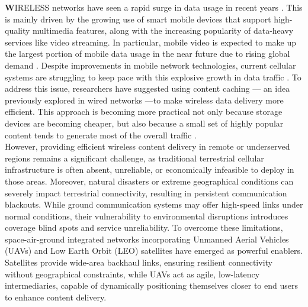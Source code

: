 \documentclass[journal]{IEEEtran}
\begin{document}
{\Huge \textbf{W}}IRELESS networks have seen a rapid surge in data usage in recent years \cite{cisco_internet_report}. This is mainly driven by the growing use of smart mobile devices that support high-quality multimedia features, along with the increasing popularity of data-heavy services like video streaming. In particular, mobile video is expected to make up the largest portion of mobile data usage in the near future due to rising global demand \cite{cisco_internet_report}. Despite improvements in mobile network technologies, current cellular systems are struggling to keep pace with this explosive growth in data traffic \cite{wang2014cache}. To address this issue, researchers have suggested using content caching — an idea previously explored in wired networks \cite{borst2010distributed}—to make wireless data delivery more efficient. This approach is becoming more practical not only because storage devices are becoming cheaper, but also because a small set of highly popular content tends to generate most of the overall traffic \cite{breslau1999web}.\\
However, providing efficient wireless content delivery in remote or underserved regions remains a significant challenge, as traditional terrestrial cellular infrastructure is often absent, unreliable, or economically infeasible to deploy in those areas. Moreover, natural disasters or extreme geographical conditions can severely impact terrestrial connectivity, resulting in persistent communication blackouts. While ground communication systems may offer high-speed links under normal conditions, their vulnerability to environmental disruptions introduces coverage blind spots and service unreliability. To overcome these limitations, space-air-ground integrated networks incorporating Unmanned Aerial Vehicles (UAVs) and Low Earth Orbit (LEO) satellites have emerged as powerful enablers. Satellites provide wide-area backhaul links, ensuring resilient connectivity without geographical constraints, while UAVs act as agile, low-latency intermediaries, capable of dynamically positioning themselves closer to end users to enhance content delivery. \\
\end{document}
